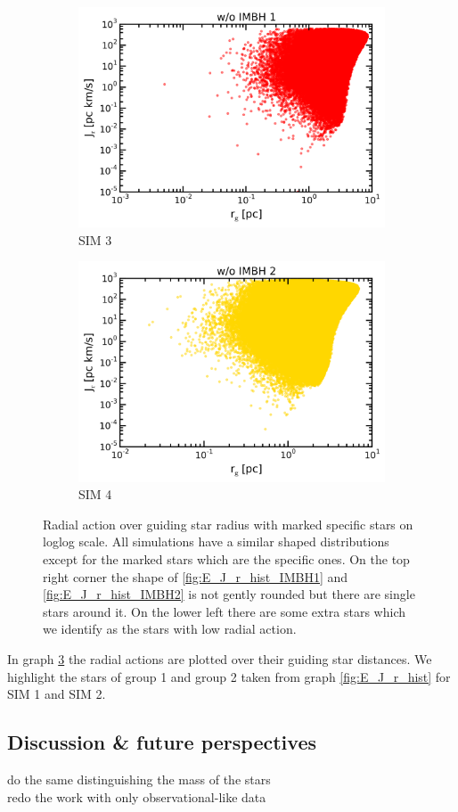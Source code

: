 \begin{figure}
\begin{subfigure}{0.475\textwidth}
		\includegraphics[width=\textwidth]{Plots/r_g_J_r_noIMBH1.png}
		\caption{SIM 3}
		\label{fig:r_g_J_r_noIMBH1}
	\end{subfigure}
	\hfill
	\begin{subfigure}{0.475\textwidth}
		\centering
		\includegraphics[width=\textwidth]{Plots/r_g_J_r_noIMBH2.png}
		\caption{SIM 4}
		\label{fig:r_g_J_r_noIMBH2}
	\end{subfigure}
	\caption{Radial action over guiding star radius with marked specific stars on loglog scale. All simulations have a similar shaped distributions except for the marked stars which are the specific ones. On the top right corner the shape of \ref{fig:E_J_r_hist_IMBH1} and \ref{fig:E_J_r_hist_IMBH2} is not gently rounded but there are single stars around it. On the lower left there are some extra stars which we identify as the stars with low radial action.}
	\label{fig:r_g_J_r}
\end{figure}
In graph \ref{fig:r_g_J_r} the radial actions are plotted over their guiding star distances. We highlight the stars of group 1 and group 2 taken from graph \ref{fig:E_J_r_hist} for SIM 1 and SIM 2. 

\subsection{Discussion \& future perspectives}
do the same distinguishing the mass of the stars\\
redo the work with only observational-like data
